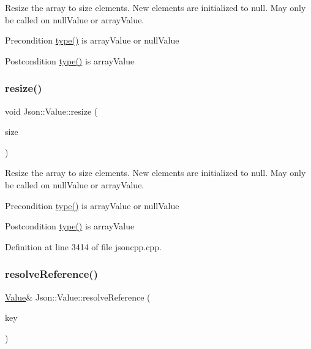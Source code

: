 Resize the array to size elements. New elements are initialized to null. May only be called on null\+Value or array\+Value. \begin{DoxyPrecond}{Precondition}
\hyperlink{class_json_1_1_value_a8ce61157a011894f0252ceed232312de}{type()} is array\+Value or null\+Value 
\end{DoxyPrecond}
\begin{DoxyPostcond}{Postcondition}
\hyperlink{class_json_1_1_value_a8ce61157a011894f0252ceed232312de}{type()} is array\+Value 
\end{DoxyPostcond}
\hypertarget{class_json_1_1_value_aa284353271ada427dbfa04a42f2be407}{}\label{class_json_1_1_value_aa284353271ada427dbfa04a42f2be407} 
\subsubsection{\texorpdfstring{resize()}{resize()}\hspace{0.1cm}{\footnotesize\ttfamily [2/2]}}
{\footnotesize\ttfamily void Json\+::\+Value\+::resize (\begin{DoxyParamCaption}\item[{\hyperlink{class_json_1_1_value_a184a91566cccca7b819240f0d5561c7d}{Array\+Index}}]{size }\end{DoxyParamCaption})}

Resize the array to size elements. New elements are initialized to null. May only be called on null\+Value or array\+Value. \begin{DoxyPrecond}{Precondition}
\hyperlink{class_json_1_1_value_a8ce61157a011894f0252ceed232312de}{type()} is array\+Value or null\+Value 
\end{DoxyPrecond}
\begin{DoxyPostcond}{Postcondition}
\hyperlink{class_json_1_1_value_a8ce61157a011894f0252ceed232312de}{type()} is array\+Value 
\end{DoxyPostcond}


Definition at line 3414 of file jsoncpp.\+cpp.

\hypertarget{class_json_1_1_value_a78817583bdc3cf28e0b8edfe74031a98}{}\label{class_json_1_1_value_a78817583bdc3cf28e0b8edfe74031a98} 
\subsubsection{\texorpdfstring{resolve\+Reference()}{resolveReference()}\hspace{0.1cm}{\footnotesize\ttfamily [1/4]}}
{\footnotesize\ttfamily \hyperlink{class_json_1_1_value}{Value}\& Json\+::\+Value\+::resolve\+Reference (\begin{DoxyParamCaption}\item[{const char $\ast$}]{key }\end{DoxyParamCaption})\hspace{0.3cm}{\ttfamily [private]}}

